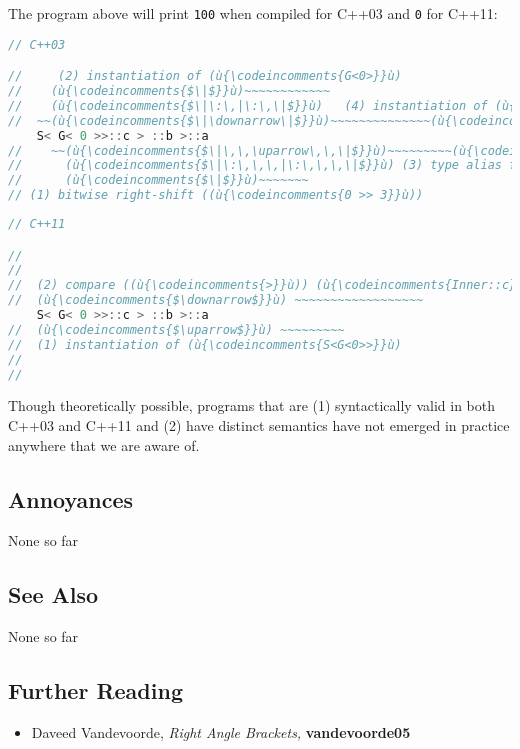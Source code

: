 \noindent The program above will print \texttt{100} when compiled for C++03 and
\texttt{0} for C++11:

\begin{lstlisting}[language=C++]
// C++03

//     (2) instantiation of (ù{\codeincomments{G<0>}}ù)
//    (ù{\codeincomments{$\|$}}ù)~~~~~~~~~~~~
//    (ù{\codeincomments{$\|\:\,|\:\,\|$}}ù)   (4) instantiation of (ù{\codeincomments{S<int>}}ù)
//  ~~(ù{\codeincomments{$\|\downarrow\|$}}ù)~~~~~~~~~~~~~~(ù{\codeincomments{$\downarrow$}}ù)
    S< G< 0 >>::c > ::b >::a
//    ~~(ù{\codeincomments{$\|\,\,\uparrow\,\,\|$}}ù)~~~~~~~~~(ù{\codeincomments{$\uparrow$}}ù)
//      (ù{\codeincomments{$\|\:\,\,\,|\:\,\,\,\|$}}ù) (3) type alias for (ù{\codeincomments{int}}ù)
//      (ù{\codeincomments{$\|$}}ù)~~~~~~~
// (1) bitwise right-shift ((ù{\codeincomments{0 >> 3}}ù))
\end{lstlisting}
    

\begin{lstlisting}[language=C++]
// C++11

//
//
//  (2) compare ((ù{\codeincomments{>}}ù)) (ù{\codeincomments{Inner::c}}ù) and (ù{\codeincomments{Outer::b}}ù)
//  (ù{\codeincomments{$\downarrow$}}ù) ~~~~~~~~~~~~~~~~~~
    S< G< 0 >>::c > ::b >::a
//  (ù{\codeincomments{$\uparrow$}}ù) ~~~~~~~~~
//  (1) instantiation of (ù{\codeincomments{S<G<0>>}}ù)
//
//
\end{lstlisting}
    
\noindent Though theoretically possible, programs that are (1) syntactically valid
in both C++03 and C++11 and (2) have distinct semantics have not
emerged in practice anywhere that we are aware of.

\subsection[Annoyances]{Annoyances}\label{annoyances}

None so far

\subsection[See Also]{See Also}\label{see-also}

None so far

\subsection[Further Reading]{Further Reading}\label{further-reading}

\begin{itemize}
\item{Daveed Vandevoorde, \textit{Right Angle Brackets,} \textbf{vandevoorde05}}
\end{itemize}


